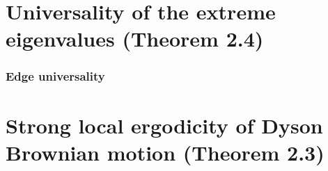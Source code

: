 \documentclass[11pt]{article}
\numberwithin{equation}{section}
\theoremstyle{definition}
\newcommand{\useSharedCounters}{%
  \theoremstyle{definition}%
  \let\definition\relax\let\enddefinition\relax
  \let\remark\relax\let\endremark\relax
  \newtheorem{definition}[theorem]{Definition}%
  \newtheorem{remark}[theorem]{Remark}%
  \theoremstyle{plain}}
\theoremstyle{plain}
\theoremstyle{definition}
\theoremstyle{plain}
\begin{document}
\clearpage
\part{Universality of the extreme eigenvalues (Theorem 2.4)}
\useSharedCounters
\section{Edge universality}\label{sec:edge}










\clearpage
\part{Strong local ergodicity of Dyson Brownian motion (Theorem 2.3)}






\clearpage
\appendix



\end{document}
